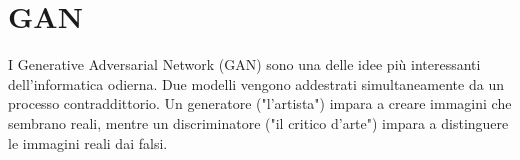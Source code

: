 
%



\section{GAN}

I Generative Adversarial Network (GAN) sono una delle idee più interessanti dell'informatica odierna. Due modelli vengono addestrati simultaneamente da un processo contraddittorio. Un generatore ("l'artista") impara a creare immagini che sembrano reali, mentre un discriminatore ("il critico d'arte") impara a distinguere le immagini reali dai falsi.
